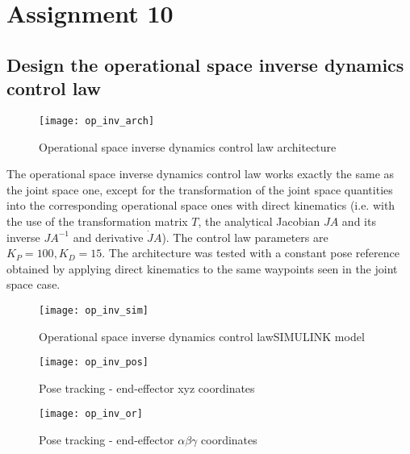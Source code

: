 \section{Assignment 10}

\subsection{Design the operational space inverse dynamics control law}

\begin{figure}[H]
\centering
\texttt{[image: op\_inv\_arch]}
\caption{Operational space inverse dynamics control law architecture}
\end{figure}

The operational space inverse dynamics control law works exactly the same as the joint space one, except for the transformation of the joint space quantities into the corresponding operational space ones with direct kinematics (i.e. with the use of the transformation matrix $T$, the analytical Jacobian $JA$ and its inverse $JA^{-1}$ and derivative $\dot JA$). The control law parameters are $K_P=100,K_D=15$. The architecture was tested with a constant pose reference obtained by applying direct kinematics to the same waypoints seen in the joint space case.

\begin{figure}[H]
\centering
\texttt{[image: op\_inv\_sim]}
\caption{Operational space inverse dynamics control lawSIMULINK model}
\end{figure}

\begin{figure}[H]
\begin{minipage}{0.5\textwidth}
\centering
\texttt{[image: op\_inv\_pos]}
\caption{Pose tracking - end-effector xyz coordinates}
\end{minipage}
\begin{minipage}{0.5\textwidth}
\centering
\texttt{[image: op\_inv\_or]}
\caption{Pose tracking - end-effector $\alpha\beta\gamma$ coordinates}
\end{minipage}
\end{figure}